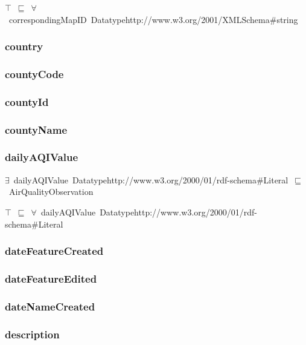\documentclass{article}
\begin{document}
\ensuremath{\top}~\ensuremath{\sqsubseteq}~\ensuremath{\forall}~correspondingMapID~Datatypehttp://www.w3.org/2001/XMLSchema#string

\subsubsection*{country}

\subsubsection*{countyCode}

\subsubsection*{countyId}

\subsubsection*{countyName}

\subsubsection*{dailyAQIValue}

\ensuremath{\exists}~dailyAQIValue~Datatypehttp://www.w3.org/2000/01/rdf-schema#Literal~\ensuremath{\sqsubseteq}~AirQualityObservation

\ensuremath{\top}~\ensuremath{\sqsubseteq}~\ensuremath{\forall}~dailyAQIValue~Datatypehttp://www.w3.org/2000/01/rdf-schema#Literal

\subsubsection*{dateFeatureCreated}

\subsubsection*{dateFeatureEdited}

\subsubsection*{dateNameCreated}

\subsubsection*{description}
\end{document}

